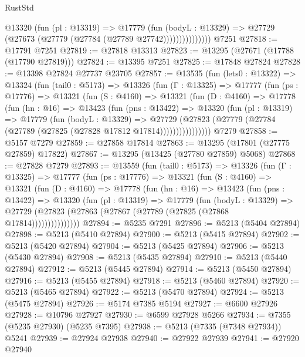 \begin{lexlean}{RustStd}
\begin{coremodule}
                    @13320
                      (fun (pl : @13319) =>
                      @17779
                        (fun (bodyL : @13329) =>
                        @27729 (@27673 (@27779 (@27784 (@27789 @27742)))))))))))))))
    @7251
@27818 := @17791 @7251
@27819 := @27818 @13313
@27823 := @13295 (@27671 (@17788 (@17790 @27819)))
@27824 := @13395 @7251
@27825 := @17848 @27824
@27828 := @13398 @27824 @27737 @23705
@27857 := @13535
    (fun (lets0 : @13322) =>
    @13324
      (fun (tail0 : @5173) =>
      @13326
        (fun (Γ : @13325) =>
        @17777
          (fun (ps : @17776) =>
          @13321
            (fun (S : @4160) =>
            @13321
              (fun (D : @4160) =>
              @17778
                (fun (hn : @16) =>
                @13423
                  (fun (pns : @13422) =>
                  @13320
                    (fun (pl : @13319) =>
                    @17779
                      (fun (bodyL : @13329) =>
                      @27729
                        (@27823
                          (@27779 (@27784 (@27789 (@27825 (@27828 @17812 @17814))))))))))))))))
    @7279
@27858 := @5157 @7279
@27859 := @27858 @17814
@27863 := @13295 (@17801 (@27775 @27859) @17822)
@27867 := @13295 (@13425 (@27780 @27859) @5068)
@27868 := @27828 @7279
@27893 := @13559
    (fun (tail0 : @5173) =>
    @13326
      (fun (Γ : @13325) =>
      @17777
        (fun (ps : @17776) =>
        @13321
          (fun (S : @4160) =>
          @13321
            (fun (D : @4160) =>
            @17778
              (fun (hn : @16) =>
              @13423
                (fun (pns : @13422) =>
                @13320
                  (fun (pl : @13319) =>
                  @17779
                    (fun (bodyL : @13329) =>
                    @27729 (@27823 (@27863 (@27867 (@27789 (@27825 (@27868 @17814)))))))))))))))
@27894 := @5235 @7291
@27896 := @5213 (@5404 @27894)
@27898 := @5213 (@5410 @27894)
@27900 := @5213 (@5415 @27894)
@27902 := @5213 (@5420 @27894)
@27904 := @5213 (@5425 @27894)
@27906 := @5213 (@5430 @27894)
@27908 := @5213 (@5435 @27894)
@27910 := @5213 (@5440 @27894)
@27912 := @5213 (@5445 @27894)
@27914 := @5213 (@5450 @27894)
@27916 := @5213 (@5455 @27894)
@27918 := @5213 (@5460 @27894)
@27920 := @5213 (@5465 @27894)
@27922 := @5213 (@5470 @27894)
@27924 := @5213 (@5475 @27894)
@27926 := @5174 @7385 @5194
@27927 := @6600 @27926
@27928 := @10796 @27927
@27930 := @6599 @27928 @5266
@27934 := @7355 (@5235 @27930) (@5235 @7395)
@27938 := @5213 (@7335 (@7348 @27934)) @5241
@27939 := @27924 @27938
@27940 := @27922 @27939
@27941 := @27920 @27940

\end{coremodule}
\end{lexlean}
